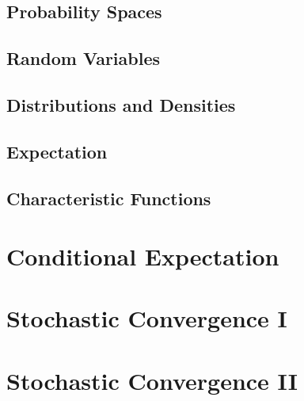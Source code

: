 \documentclass{article}
\theoremstyle{definition}
\begin{document}
	\subsection{Probability Spaces}
	\subsection{Random Variables}
	\subsection{Distributions and Densities}
	\subsection{Expectation}
	\subsection{Characteristic Functions}
	\section{Conditional Expectation}
	\section{Stochastic Convergence I}
	\section{Stochastic Convergence II}
	\newpage
	{} 
\end{document}
